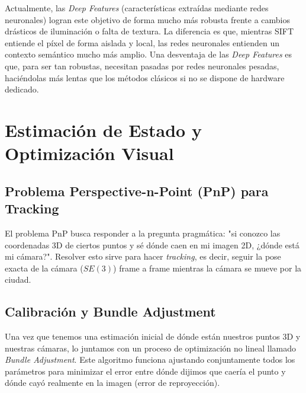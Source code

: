 Actualmente, las \textit{Deep Features} (características extraídas mediante redes neuronales) logran este objetivo de forma mucho más robusta frente a cambios drásticos de iluminación o falta de textura. La diferencia es que, mientras SIFT entiende el píxel de forma aislada y local, las redes neuronales entienden un contexto semántico mucho más amplio. Una desventaja de las \textit{Deep Features} es que, para ser tan robustas, necesitan pasadas por redes neuronales pesadas, haciéndolas más lentas que los métodos clásicos si no se dispone de hardware dedicado.


\section{Estimación de Estado y Optimización Visual}

\subsection{Problema Perspective-n-Point (PnP) para Tracking}
El problema PnP busca responder a la pregunta pragmática: "si conozco las coordenadas 3D de ciertos puntos y sé dónde caen en mi imagen 2D, ¿dónde está mi cámara?". Resolver esto sirve para hacer \textit{tracking}, es decir, seguir la pose exacta de la cámara ($SE(3)$) frame a frame mientras la cámara se mueve por la ciudad.


\subsection{Calibración y Bundle Adjustment}
Una vez que tenemos una estimación inicial de dónde están nuestros puntos 3D y nuestras cámaras, lo juntamos con un proceso de optimización no lineal llamado \textit{Bundle Adjustment}. Este algoritmo funciona ajustando conjuntamente todos los parámetros para minimizar el error entre dónde dijimos que caería el punto y dónde cayó realmente en la imagen (error de reproyección).


